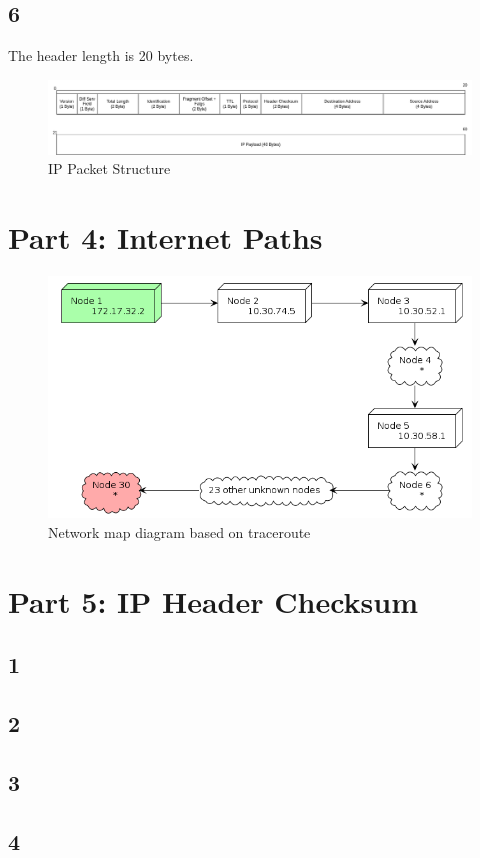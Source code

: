 \documentclass{article}
\begin{document}
    \subsection*{6}
    The header length is 20 bytes.
    \begin{figure}[htbp]
        \centering
        \includegraphics[width=\textwidth]{images/part3.drawio.png}
        \caption{IP Packet Structure}
    \end{figure}
    \section*{Part 4: Internet Paths}
    \begin{figure}[htbp]
        \centering
        \includegraphics[width=\textwidth]{images/part4.plantuml.png}
        \caption{Network map diagram based on traceroute}
    \end{figure}
    \clearpage
    
    \section*{Part 5: IP Header Checksum}
    \subsection*{1}
    \subsection*{2}
    \subsection*{3}
    \subsection*{4}
\end{document}
